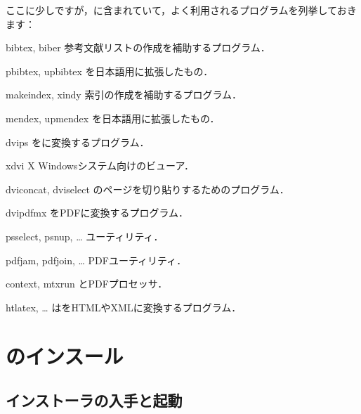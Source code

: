 \documentclass[uplatex,dvipdfmx]{jsarticle}
\begin{document}
ここに少しですが，\TL に含まれていて，よく利用されるプログラムを列挙しておきます：
%
\begin{cmddescription}
\item[bibtex, biber]
参考文献リストの作成を補助するプログラム．

\item[pbibtex, upbibtex]
を日本語用に拡張したもの．

\item[makeindex, xindy]
索引の作成を補助するプログラム．

\item[mendex, upmendex]
を日本語用に拡張したもの．

\item[dvips]
\DVI を\PS に変換するプログラム．

\item[xdvi]
X Windowsシステム向けの\DVI ビューア．

\item[dviconcat, dviselect]
\DVI のページを切り貼りするためのプログラム．

\item[dvipdfmx]
\DVI をPDFに変換するプログラム．

\item[psselect, psnup, \ldots]
\PS ユーティリティ．

\item[pdfjam, pdfjoin, \ldots]
PDFユーティリティ．

\item[context, mtxrun]
\ConTeXt とPDFプロセッサ．

\item[htlatex, \ldots]
は\AllTeX をHTMLやXMLに変換するプログラム．
\end{cmddescription}

\section{\TL のインスール}
\label{sec:install}

\subsection{インストーラの入手と起動}
\label{sec:inst-start}
\end{document}
